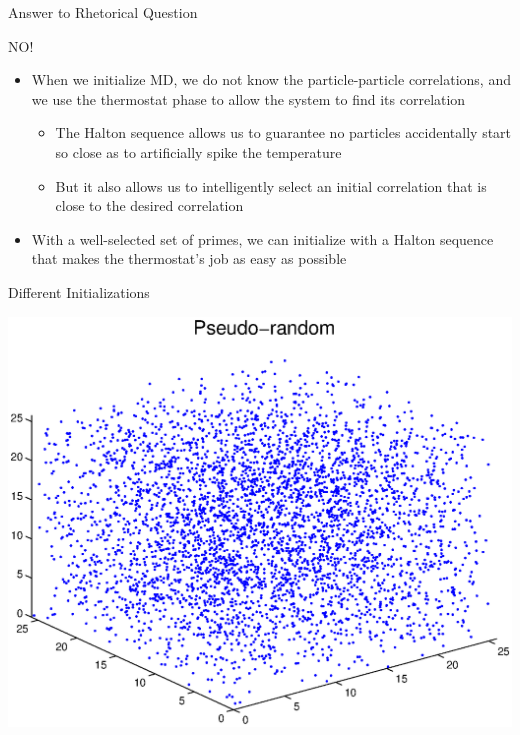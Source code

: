 \documentclass{beamer}
\begin{document}
	\begin{frame}{Answer to Rhetorical Question}
	\begin{center}\huge NO!\end{center}
	\begin{itemize}
	\item When we initialize MD, we do not know the particle-particle correlations, and we use the thermostat phase to allow the system to find its correlation 
	\vspace{0.5em}
	\begin{itemize}
\item The Halton sequence allows us to guarantee no particles accidentally start so close as to artificially spike the temperature\vspace{0.5em}
\item But it also allows us to intelligently select an initial correlation that is close to the desired correlation\vspace{0.5em}
\end{itemize}
\item With a well-selected set of primes, we can initialize with a Halton sequence that makes the thermostat's job as easy as possible
	\end{itemize}
	
	\end{frame}
	
	
	
	
	\begin{frame}{Different Initializations}
	\begin{center}\includegraphics[width=\linewidth]{uniformscatter.eps}\end{center}
	
	\end{frame}
	
\end{document}
